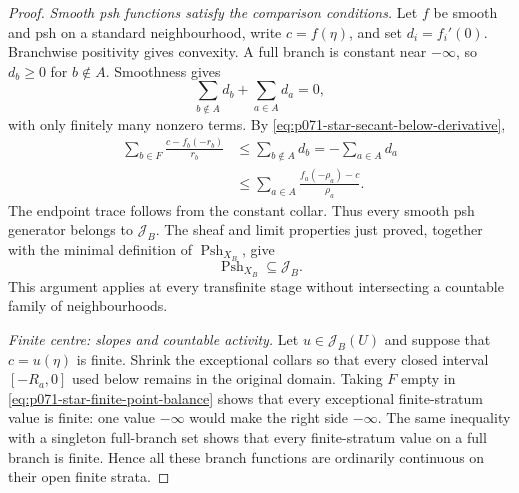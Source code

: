 \begin{proof}
\medskip\noindent
\emph{Smooth psh functions satisfy the comparison conditions.}
Let \(f\) be smooth and psh on a standard neighbourhood, write
\(c=f(\eta)\), and set \(d_i=f_i'(0)\).  Branchwise positivity gives
convexity.  A full branch is constant near \(-\infty\), so \(d_b\geq0\)
for \(b\notin A\).  Smoothness gives
\[
             \sum_{b\notin A}d_b+\sum_{a\in A}d_a=0,
\]
with only finitely many nonzero terms.  By
\eqref{eq:p071-star-secant-below-derivative},
\begin{align*}
 \sum_{b\in F}\frac{c-f_b(-r_b)}{r_b}
 &\leq \sum_{b\notin A}d_b
  =-\sum_{a\in A}d_a\\
 &\leq \sum_{a\in A}\frac{f_a(-\rho_a)-c}{\rho_a}.
\end{align*}
The endpoint trace follows from the constant collar.  Thus every smooth
psh generator belongs to \(\mathscr J_B\).  The sheaf and limit properties
just proved, together with the minimal definition of
\(\operatorname{Psh}_{X_B}\), give
\begin{equation}
                   \operatorname{Psh}_{X_B}
                         \subseteq\mathscr J_B.
 \label{eq:p071-star-psh-in-comparison}
\end{equation}
This argument applies at every transfinite stage without intersecting a
countable family of neighbourhoods.

\medskip\noindent
\emph{Finite centre: slopes and countable activity.}
Let \(u\in\mathscr J_B(U)\) and suppose that \(c=u(\eta)\) is finite.
Shrink the exceptional collars so that every closed interval
\([-R_a,0]\) used below remains in the original domain.  Taking \(F\)
empty in \eqref{eq:p071-star-finite-point-balance} shows that every
exceptional finite-stratum value is finite: one value \(-\infty\) would
make the right side \(-\infty\).  The same inequality with a singleton
full-branch set shows that every finite-stratum value on a full branch is
finite.  Hence all these branch functions are ordinarily continuous on
their open finite strata.


\end{proof}
